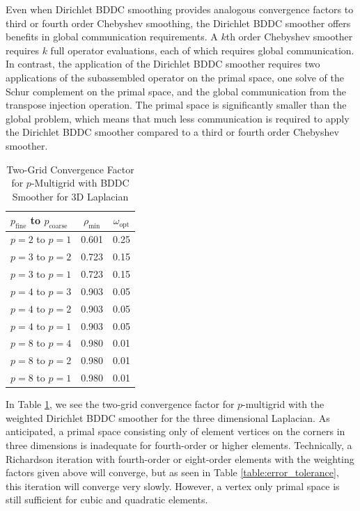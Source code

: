 Even when Dirichlet BDDC smoothing provides analogous convergence factors to third or fourth order Chebyshev smoothing, the Dirichlet BDDC smoother offers benefits in global communication requirements.
A $k$th order Chebyshev smoother requires $k$ full operator evaluations, each of which requires global communication.
In contrast, the application of the Dirichlet BDDC smoother requires two applications of the subassembled operator on the primal space, one solve of the Schur complement on the primal space, and the global communication from the transpose injection operation.
The primal space is significantly smaller than the global problem, which means that much less communication is required to apply the Dirichlet BDDC smoother compared to a third or fourth order Chebyshev smoother.

\begin{table}[ht!]
\begin{center}
\begin{tabular}{l cc}
  \toprule
  $p_{\text{fine}}$ to $p_{\text{coarse}}$  & $\rho_{\min}$ & $\omega_{\text{opt}}$  \\
  \toprule
  $p = 2$ to $p = 1$   &  0.601 & 0.25  \\
  \midrule
  $p = 3$ to $p = 2$   &  0.723 & 0.15  \\
  $p = 3$ to $p = 1$   &  0.723 & 0.15  \\
  \midrule
  $p = 4$ to $p = 3$   &  0.903 & 0.05  \\
  $p = 4$ to $p = 2$   &  0.903 & 0.05  \\
  $p = 4$ to $p = 1$   &  0.903 & 0.05  \\
  \midrule
  $p = 8$ to $p = 4$   &  0.980 & 0.01  \\
  $p = 8$ to $p = 2$   &  0.980 & 0.01  \\
  $p = 8$ to $p = 1$   &  0.980 & 0.01  \\
  \bottomrule
\end{tabular}
\end{center}
\caption{Two-Grid Convergence Factor for $p$-Multigrid with BDDC Smoother for 3D Laplacian}
\label{table:two_grid_bddc_smoother_3d}
\end{table}

In Table \ref{table:two_grid_bddc_smoother_3d}, we see the two-grid convergence factor for $p$-multigrid with the weighted Dirichlet BDDC smoother for the three dimensional Laplacian.
As anticipated, a primal space consisting only of element vertices on the corners in three dimensions is inadequate for fourth-order or higher elements.
Technically, a Richardson iteration with fourth-order or eight-order elements with the weighting factors given above will converge, but as seen in Table \ref{table:error_tolerance}, this iteration will converge very slowly.
However, a vertex only primal space is still sufficient for cubic and quadratic elements.

